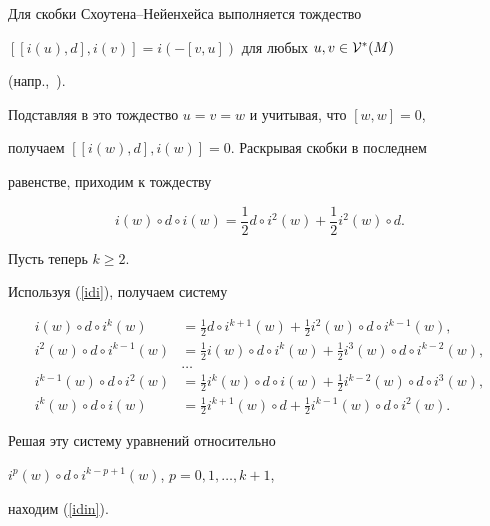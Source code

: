 \begin{pf}


Для скобки  Схоутена--Нейенхейса выполняется тождество


$[[i(u), d],i(v)]=i(-[v,u])$ для любых $u,v\in{\cal V}^*(M)$


(напр.,~\cite{Mich}).


Подставляя в это тождество $u=v=w$ и учитывая, что $[w,w]=0$,


получаем $[[i(w), d],i(w)]=0$. Раскрывая скобки в последнем


равенстве, приходим к тождеству


\begin{equation}


\label{idi}


i(w)\circ d\circ i(w)=\frac12 d\circ i^2(w)+ \frac12 i^2(w)\circ d.


\end{equation}





Пусть теперь $k\ge 2$.


Используя (\ref{idi}), получаем систему


\begin{align*}


i(w)\circ d \circ i^k(w) &=


\frac12 d\circ i^{k+1}(w) + \frac12 i^2(w)\circ d\circ


i^{k-1}(w),\\


i^2(w)\circ d \circ i^{k-1}(w) &= \frac12 i(w)\circ  d\circ i^{k}(w) +


\frac12 i^3(w)\circ d\circ i^{k-2}(w),\\


&\dotsc\\


i^{k-1}(w)\circ d \circ i^{2}(w) &=


\frac12 i^{k}(w)\circ d\circ i(w) +


\frac12i^{k-2}(w)\circ d\circ i^{3}(w),\\


i^{k}(w)\circ d \circ i(w) &=


\frac12 i^{k+1}(w)\circ d +


\frac12i^{k-1}(w)\circ d\circ i^{2}(w).


\end{align*}


Решая эту систему уравнений относительно


$i^p(w)\circ d \circ i^{k-p+1}(w)$, $p=0,1,\dotsc, k+1$,


находим (\ref{idin}).


\end{pf}








